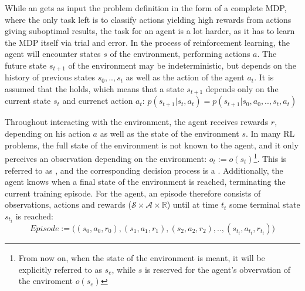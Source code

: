 \noindent While an  gets as input the problem definition in the form of a complete MDP, where the only task left is to classify actions yielding high rewards from actions giving suboptimal results, the task for an  agent is a lot harder, as it has to learn the MDP itself via trial and error. In the process of reinforcement learning, the agent will encounter states $s$ of the environment, performing actions $a$. The future state $s_{t+1}$ of the environment may be indeterministic, but depends on the history of previous states $s_0, .., s_t$ as well as the action of the agent $a_t$. It is assumed that the  holds, which means that a state  $s_{t+1}$ depends only on the current state $s_t$ and currenct action $a_t$: $p(s_{t+1}|s_t,a_t) = p(s_{t+1}|s_0,a_0,..,s_t,a_t)$

Throughout interacting with the environment, the agent receives rewards $r$, depending on his action $a$ as well as the state of the environment $s$. In many RL problems, the full state of the environment is not known to the agent, and it only perceives an observation depending on the environment: $o_t := o(s_t)$\footnote{From now on, when the state of the environment is meant, it will be explicitly referred to as $s_e$, while $s$ is reserved for the agent's obvervation of the enviroment $o(s_e)$}. This is referred to as , and the corresponding decision process is a . Additionally, the agent knows when a final state of the environment is reached, terminating the current training episode. For the agent, an episode therefore consists of observations, actions and rewards ($\mathcal{S} \times \mathcal{A} \times \mathds{R}$) until at time $t_t$ some terminal state $s_{t_t}$ is reached: $$Episode := \big((s_0, a_0, r_0), (s_1, a_1, r_1), (s_2,a_2,r_2), .., (s_{t_t}, a_{t_t}, r_{t_t})\big)$$

